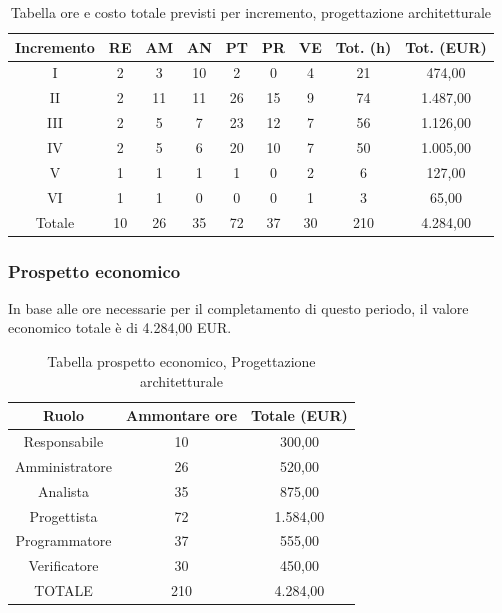 \begin{table}[h]
	\caption{Tabella ore e costo totale previsti per incremento, progettazione architetturale}
	\begin{center}
		\begin{tabular}{ |c|c|c|c|c|c|c|c|c|  }
			\hline
			Incremento 		& RE 	& AM 	& AN 	& PT 	& PR 	& VE 	& Tot. (h) & Tot. (EUR) \\
			\hline\hline
			I		& 2 		& 3			& 10 	& 2 	& 0 		& 4 		& 21	 & 474,00\\
			II		& 2 		& 11 		& 11 	& 26	& 15 		& 9 		& 74	&1.487,00\\
			III		& 2 		& 5 		& 7 	& 23	& 12 		& 7 		& 56	&1.126,00\\
			IV		& 2 		& 5 		& 6 	& 20 	& 10 		& 7 		& 50 	&1.005,00\\
			V		& 1 		& 1 		& 1 	& 1		& 0 		& 2	 		& 6			&127,00\\
			VI		& 1 		& 1 		& 0 	& 0 	& 0 		& 1 		& 3			&65,00\\
			\hline\hline
			Totale		& 10		& 26		& 35 	& 72	 	& 37 	& 30 	& 210 	&4.284,00\\
			\hline
		\end{tabular}
	\end{center}
\end{table}

\subsubsection{Prospetto economico}
In base alle ore necessarie per il completamento di questo periodo, il valore economico totale è di 4.284,00 EUR.
\begin{table}[h]
	\caption{Tabella prospetto economico, Progettazione architetturale}
\begin{center}
\begin{tabular}{ |c|c|c|  }
 \hline
 Ruolo 		& Ammontare ore 	& Totale (EUR)\\
 	\hline
 \hline
 	Responsabile	& 10 	& 300,00\\
	Amministratore	& 26		& 520,00\\
	Analista		& 35 	& 875,00\\
	Progettista		& 72		& 1.584,00\\
	Programmatore	& 37		& 555,00\\
	Verificatore	& 30 	& 450,00\\
 \hline\hline
 TOTALE		& 210		& 4.284,00\\
  \hline
\end{tabular}
\end{center}
\end{table}
\newpage
